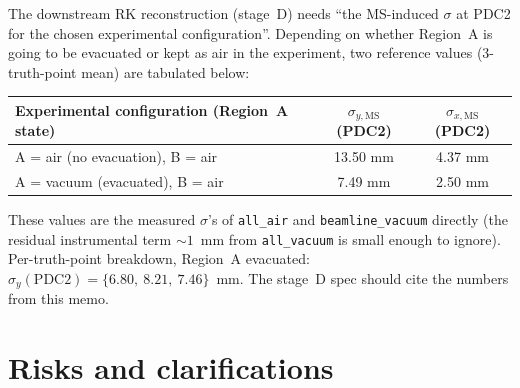 \documentclass[a4paper, 11pt]{article}
\begin{document}
The downstream RK reconstruction (stage~D) needs ``the MS-induced $\sigma$ at PDC2 for the chosen experimental configuration''. Depending on whether Region~A is going to be evacuated or kept as air in the experiment, two reference values (3-truth-point mean) are tabulated below:

\begin{center}
\begin{tabular}{lcc}
\toprule
Experimental configuration (Region~A state) & $\sigma_{y,\mathrm{MS}}$(PDC2) & $\sigma_{x,\mathrm{MS}}$(PDC2) \\
\midrule
A = air (no evacuation), B = air      & 13.50 mm & 4.37 mm \\
A = vacuum (evacuated), B = air       &  7.49 mm & 2.50 mm \\
\bottomrule
\end{tabular}
\end{center}

These values are the measured $\sigma$'s of \texttt{all\_air} and \texttt{beamline\_vacuum} directly (the residual instrumental term $\sim 1$~mm from \texttt{all\_vacuum} is small enough to ignore). Per-truth-point breakdown, Region~A evacuated: $\sigma_y(\mathrm{PDC2}) = \{6.80,\ 8.21,\ 7.46\}$~mm. The stage~D spec should cite the numbers from this memo.

\section{Risks and clarifications}
\end{document}
